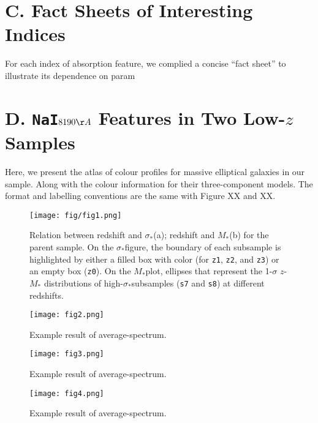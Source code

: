 \documentclass[preprint]{aastex}
\def\mstar{$M_{\ast}$}
\def\sigstar{$\sigma_{\ast}$}
\def\nai{{\tt NaI}}
\begin{document}
\begin{CJK*}{UTF8}{gbsn}
\section{C. Fact Sheets of Interesting Indices}

    For each index of absorption feature, we complied a concise ``fact 
    sheet'' to illustrate its dependence on param

\section{D. \nai $8190 \AA$ Features in Two Low-$z$ Samples} 

  Here, we present the atlas of colour profiles for massive elliptical 
  galaxies in our sample.  Along with the colour information for their 
  three-component models.  The format and labelling conventions are the 
  same with Figure XX and XX.  
  

\clearpage
{}
\begin{figure}
    \centering 
    \texttt{[image: fig/fig1.png]}
    \caption{
    Relation between redshift and \sigstar (a); redshift and \mstar (b) for 
    the parent sample.  On the \sigstar figure, the boundary of each 
    subsample is highlighted by either a filled box with color (for 
    {\tt z1}, {\tt z2}, and {\tt z3}) or an empty box ({\tt z0}).  On the 
    \mstar plot, ellipses that represent the 1-$\sigma$ $z$-\mstar 
    distributions of high-\sigstar subsamples ({\tt s7} and {\tt s8}) 
    at different redshifts. 
    }
    \label{figure:1}
\end{figure}

\clearpage
{}
\begin{figure}
    \centering 
    \texttt{[image: fig2.png]}
    \caption{
    Example result of average-spectrum. 
    }
    \label{figure:2}
\end{figure}

\clearpage
{}
\begin{figure}
    \centering 
    \texttt{[image: fig3.png]}
    \caption{
    Example result of average-spectrum. 
    }
    \label{figure:3}
\end{figure}

\clearpage
{}
\begin{figure}
    \centering 
    \texttt{[image: fig4.png]}
    \caption{
    Example result of average-spectrum. 
    }
    \label{figure:4}
\end{figure}


\end{CJK*}
\end{document}
